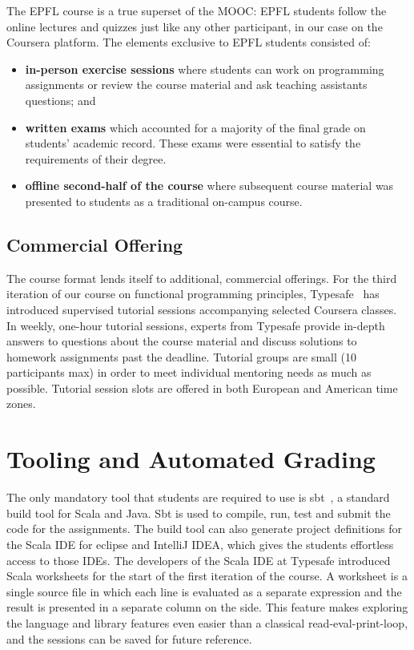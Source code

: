\documentclass{sig-alternate}
\begin{document}
The EPFL course is a true superset of the MOOC: EPFL students follow the
online lectures and quizzes just like any other participant, in our
case on the Coursera platform. The elements exclusive to EPFL students
consisted of:

\begin{itemize}
\item {\bf in-person exercise sessions} where students can work on programming assignments or review the course material and ask teaching assistants questions; and
\item {\bf written exams} which accounted for a majority of the final grade on students'  academic record. These exams were essential to satisfy the requirements of
  their degree.
\item {\bf offline second-half of the course} where subsequent course material was presented to students as a traditional on-campus course.
\end{itemize}

\subsection{Commercial Offering}

The course format lends itself to additional, commercial offerings. For the
third iteration of our course on functional programming principles, Typesafe~\cite{typesafe}
has introduced supervised tutorial sessions accompanying selected Coursera
classes. In weekly, one-hour tutorial sessions, experts from Typesafe provide
in-depth answers to questions about the course material and discuss solutions
to homework assignments past the deadline. Tutorial groups are small (10
participants max) in order to meet individual mentoring needs as much as
possible. Tutorial session slots are offered in both European and American
time zones.

\section{Tooling and Automated Grading}
\label{sec:tooling-automated-grading}

The only mandatory tool that students are required to use is sbt~\cite{sbt}, a
standard build tool for Scala and Java. Sbt is used to compile, run, test and
submit the code for the assignments. The build tool can also generate project
definitions for the Scala IDE for eclipse and IntelliJ IDEA, which gives the
students effortless access to those IDEs. The developers of the Scala IDE at
Typesafe introduced Scala worksheets for the start of the first iteration
of the course. A worksheet is a single source file in which each line is
evaluated as a separate expression and the result is presented in a separate
column on the side. This feature makes exploring the language and library
features even easier than a classical read-eval-print-loop, and the sessions
can be saved for future reference.
\end{document}
